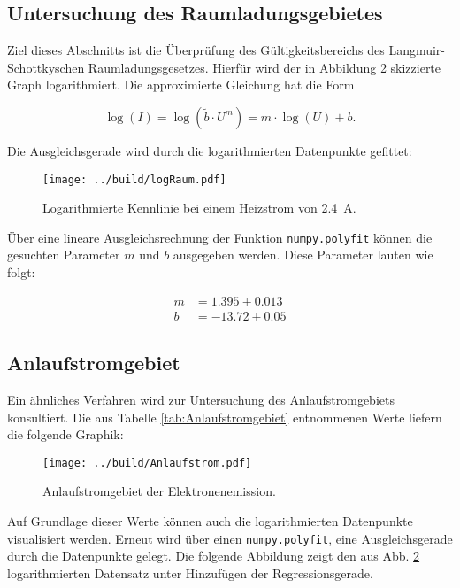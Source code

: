 \subsection{Untersuchung des Raumladungsgebietes}
\label{sec:Raumladungsgebiet}

Ziel dieses Abschnitts ist die Überprüfung des Gültigkeitsbereichs des Langmuir-Schottkyschen Raumladungsgesetzes. Hierfür wird der in Abbildung \ref{fig:Kennlinien2}
skizzierte Graph logarithmiert. Die approximierte Gleichung hat die Form

\begin{equation*}
    \log(I) = \log(\tilde{b}\cdot{}U^m) = m\cdot\log(U) + b.
\end{equation*}

\noindent Die Ausgleichsgerade wird durch die logarithmierten Datenpunkte gefittet: 

\begin{figure}[H]
    \centering 
    \texttt{[image: ../build/logRaum.pdf]}
    \caption{Logarithmierte Kennlinie bei einem Heizstrom von \qty{2.4}{\ampere}.}
    \label{fig:Kennlinien2}
\end{figure}

\noindent Über eine lineare Ausgleichsrechnung der Funktion \texttt{numpy.polyfit} können die gesuchten Parameter $m$ und $b$ ausgegeben werden.
Diese Parameter lauten wie folgt:

\begin{align*}
    m &= 1.395\pm0.013\\
    b &= -13.72\pm0.05
\end{align*}

\subsection{Anlaufstromgebiet}
\label{sec:AnlaufstromgebietSec}


Ein ähnliches Verfahren wird zur Untersuchung des Anlaufstromgebiets konsultiert. Die aus Tabelle \ref{tab:Anlaufstromgebiet} entnommenen Werte 
liefern die folgende Graphik:

\begin{figure}[H]
    \centering 
    \texttt{[image: ../build/Anlaufstrom.pdf]}
    \caption{Anlaufstromgebiet der Elektronenemission.}
    \label{fig:Kennlinien2}
\end{figure}

\noindent Auf Grundlage dieser Werte können auch die logarithmierten Datenpunkte visualisiert werden. Erneut wird über einen \texttt{numpy.polyfit},
eine Ausgleichsgerade durch die Datenpunkte gelegt. Die folgende Abbildung zeigt den aus Abb. \ref{fig:Kennlinien2} logarithmierten Datensatz unter 
Hinzufügen der Regressionsgerade.

